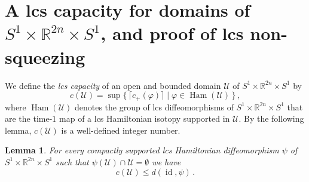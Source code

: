 \documentclass{amsart}
\DeclareMathOperator{\Ham}{Ham}
\DeclareMathOperator{\id}{id}
\newtheorem{lemma}[thm]{Lemma}
\theoremstyle{remark}
\begin{document}
\section{A lcs capacity for domains of $S^1 \times \mathbb{R}^{2n} \times S^1$,
and proof of lcs non-squeezing}\label{section: capacity}

We define the \emph{lcs capacity}
of an open and bounded domain $\mathcal{U}$
of $S^1 \times \mathbb{R}^{2n} \times S^1$
by
\[
c (\mathcal{U})
= \sup \{\, \lceil c_+ (\varphi) \rceil \;\lvert \; \varphi \in \Ham (\mathcal{U})\,\} \,,
\]
where $\Ham (\mathcal{U})$ denotes
the group of lcs diffeomorphisms of $S^1 \times \mathbb{R}^{2n} \times S^1$
that are the time-$1$ map
of a lcs Hamiltonian isotopy supported in $\mathcal{U}$.
By the following lemma,
$c (\mathcal{U})$ is a well-defined integer number.

\begin{lemma}\label{lemma: displacement}
For every compactly supported
lcs Hamiltonian diffeomorphism $\psi$
of $S^1 \times \mathbb{R}^{2n} \times S^1$
such that $\psi (\mathcal{U}) \cap \mathcal{U} = \emptyset$
we have
\[
c (\mathcal{U}) \leq d (\id, \psi) \,.
\]
\end{lemma}
\end{document}
